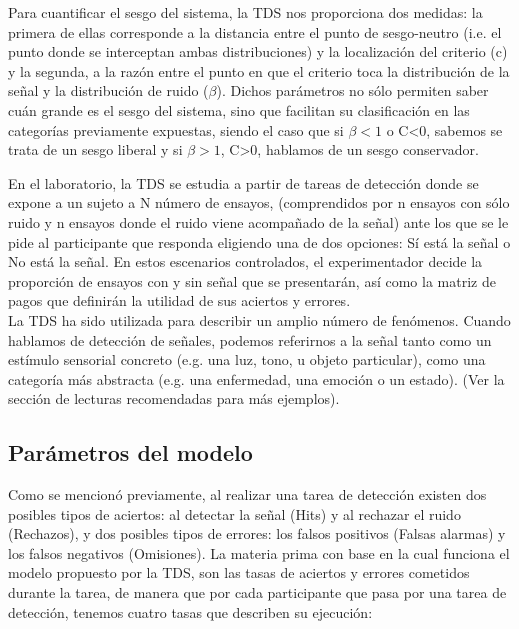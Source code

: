 \begin{itemize}
\begin{itemize}
Para cuantificar el sesgo del sistema, la TDS nos proporciona dos medidas: la primera de ellas corresponde a la distancia entre el punto de sesgo-neutro (i.e. el punto donde se interceptan ambas distribuciones) y la localización del criterio (c) y la segunda, a la razón entre el punto en que el criterio toca la distribución de la señal y la distribución de ruido ($\beta$). Dichos parámetros no sólo permiten saber cuán grande es el sesgo del sistema, sino que facilitan su clasificación en las categorías previamente expuestas, siendo el caso que si $\beta<1$ o C<0, sabemos se trata de un sesgo liberal y si $\beta>1$, C>0, hablamos de un sesgo conservador.\\
     \end{itemize}
\end{itemize}

En el laboratorio, la  TDS se estudia a partir  de tareas de detección donde se expone a un  sujeto  a  N  número  de  ensayos,  (comprendidos  por  n  ensayos con  sólo  ruido  y  n  ensayos donde  el  ruido  viene  acompañado  de  la  señal)  ante  los  que  se  le  pide  al  participante  que responda eligiendo una de dos opciones: Sí está la señal o No está la señal. En estos escenarios controlados,  el  experimentador  decide  la  proporción  de  ensayos  con  y  sin  señal  que  se presentarán, así como la matriz de pagos que definirán la utilidad de sus aciertos y errores. \\

La TDS ha sido utilizada para describir un amplio número de fenómenos. Cuando hablamos de detección de señales, podemos referirnos a la señal tanto como un estímulo sensorial concreto (e.g. una luz, tono, u objeto particular), como una categoría más abstracta (e.g. una enfermedad, una emoción o un estado).  (Ver la sección de lecturas recomendadas para más ejemplos).\\


\subsection{Parámetros del modelo}

Como se mencionó previamente, al realizar una tarea de detección existen dos posibles tipos de aciertos: al detectar la señal (Hits) y al rechazar el ruido (Rechazos), y dos posibles tipos de errores: los falsos positivos (Falsas alarmas) y los falsos negativos (Omisiones). La materia prima con base en la cual funciona el modelo propuesto por la TDS, son las tasas de aciertos y errores cometidos durante la tarea, de manera que por cada participante que pasa por una tarea de detección, tenemos cuatro tasas que describen su ejecución:

